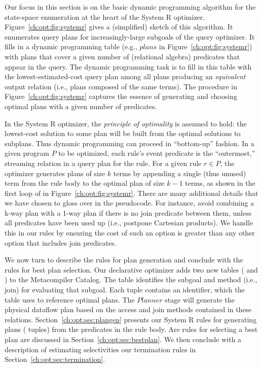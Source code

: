 Our focus in this section is on the basic dynamic programming algorithm for the
state-space enumeration at the heart of the System R optimizer.
Figure~\ref{ch:opt:fig:systemr} gives a (simplified) sketch of this
algorithm.  It enumerates query plans for increasingly-large subgoals of the
query optimizer.  It fills in a dynamic programming table (e.g., $plans$ in
Figure~\ref{ch:opt:fig:systemr}) with plans that cover a given number of
(relational algebra) predicates that appear in the query.  The dynamic
programming task is to fill in this table with the lowest-estimated-cost query
plan among all plans producing an {\em equivalent} output relation (i.e., plans
composed of the same terms).  The  procedure in
Figure~\ref{ch:opt:fig:systemr} captures the essence of generating and
choosing optimal plans with a given number of predicates.

In the System R optimizer, the {\em principle of optimality} is assumed to
hold: the lowest-cost solution to some plan will be built from the optimal
solutions to subplans.  Thus dynamic programming can proceed in ``bottom-up''
fashion.  In a given program $P$ to be optimized, each rule's event predicate
is the ``outermost,'' streaming relation in a query plan for the rule.  For a
given rule $r \in P$, the optimizer generates plans of size $k$ terms by
appending a single (thus unused) term from the rule body to the optimal plan of
size $k-1$ terms, as shown in the first loop of  in
Figure~\ref{ch:opt:fig:systemr}.  There are many additional details that we
have chosen to gloss over in the pseudocode.  For instance, avoid combining a
k-way plan with a 1-way plan if there is no join predicate between them, unless
all predicates have been used up (i.e., postpone Cartesian products).  We
handle this in our \OVERLOG rules by ensuring the cost of such an option is
greater than any other option that includes join predicates.  

We now turn to describe the \OVERLOG rules for plan generation and conclude
with the rules for best plan selection.  Our declarative optimizer adds two new
tables ( and ) to the Metacompiler Catalog.  The
 table identifies the subgoal and method (i.e., join) for evaluating
that subgoal.  Each  tuple contains an identifier, which the
 table uses to reference optimal plans.  The $Planner$ stage will
generate the physical dataflow plan based on the access and join methods
contained in these relations.  Section~\ref{ch:opt:sec:plangen} presents our
System R rules for generating plans ( tuples) from the predicates in
the rule body.  Are rules for selecting a best plan are discussed in
Section~\ref{ch:opt:sec:bestplan}.  We then conclude with a description of
estimating selectivities our termination rules in
Section~\ref{ch:opt:sec:termination}.

